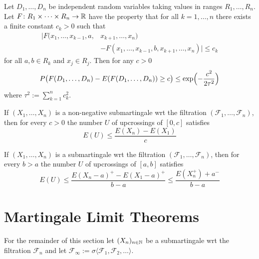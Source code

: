 \begin{theorem}
Let $D_1,\ldots, D_n$ be independent random variables taking values in ranges $R_1, \ldots, R_n$. Let $F\colon R_1\times \cdots \times R_n\rightarrow \Bbb R$ have the property that for all $k=1,\ldots, n$  there exists a finite constant $c_k>0$ such that
\begin{align*}
\bigl|F(x_1,\ldots, x_{k-1}, a, &x_{k+1},\ldots, x_n) \\
&- F(x_1,\ldots, x_{k-1}, b, x_{k+1},\ldots, x_n)\bigr|\leq c_k
\end{align*}
for all $a,b \in R_k$ and $x_j\in R_j$.  Then for any $c>0$
\[
P\bigl(F(D_1,\ldots, D_n) - E(F(D_1,\ldots, D_n)) \geq c\bigr) \leq \exp\Bigl(-\frac{c^2}{2\tau^2}\Bigr)
\]
where $\tau^2:= \sum_{k=1}^n c_k^2$.
\end{theorem}



\begin{theorem}
If $(X_1, \ldots, X_n)$ is a non-negative submartingale wrt the filtration $(\mathcal F_1, \ldots, \mathcal F_n)$, then for every $c > 0$ the number $U$ of upcrossings of $[0,c]$ satisfies
\begin{equation}
E(U)\leq \frac{E(X_n)- E(X_1)}{c}
\end{equation}
\end{theorem}



\begin{corollary}
If $(X_1, \ldots, X_n)$ is a  submartingale wrt the filtration $(\mathcal F_1, \ldots, \mathcal F_n)$, then for every $b > a$ the number $U$ of upcrossings of $[a,b]$ satisfies
\[
E(U)\leq \frac{E(X_n-a)^+ - E(X_1 - a)^+ }{b - a}\leq \frac{E(X_n^+) + a^-}{b-a}
\]
\end{corollary}



%
%
\section{Martingale Limit Theorems}




\begin{sectionassumption}
For the remainder of this section let $(X_n)_{n\in \Bbb N}$ be a submartingale wrt the filtration $\mathcal F_n$ and let $\mathcal F_\infty:=\sigma\langle \mathcal F_1, \mathcal F_2, \ldots \rangle$.
\end{sectionassumption}




